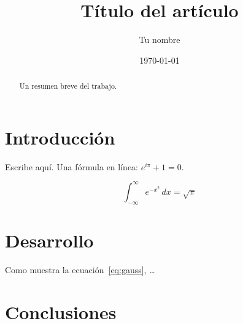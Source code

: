\documentclass[11pt, a4paper]{article}
\title{Título del artículo}
\author{Tu nombre}
\date{\today}
\begin{document}
\maketitle

\begin{abstract}
    Un resumen breve del trabajo.
\end{abstract}

\section{Introducción}

Escribe aquí. Una fórmula en línea: $e^{i\pi} + 1 = 0$.

\begin{equation}
    \int_{-\infty}^{\infty} e^{-x^2} \, dx = \sqrt{\pi}
    \label{eq:gauss}
\end{equation}

\section{Desarrollo}

Como muestra la ecuación~\eqref{eq:gauss}, \ldots

\section{Conclusiones}
\end{document}
